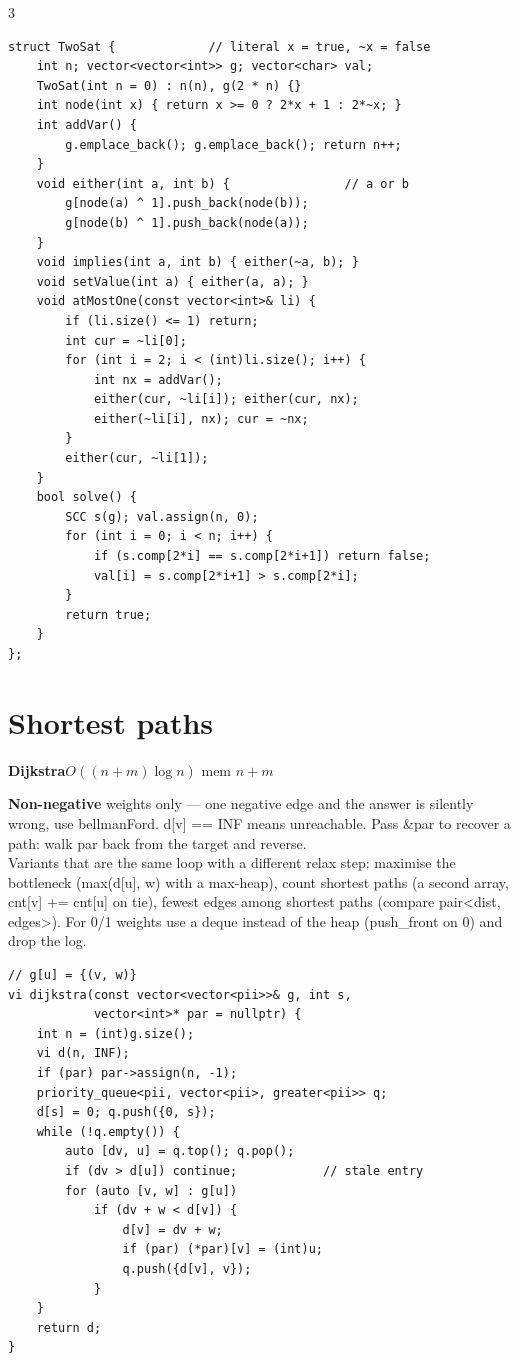 \documentclass[9pt,a4paper]{extarticle}
\newcommand{\entry}[3]{%
  \addcontentsline{toc}{subsection}{#1}%
  \vspace{0.8ex}%
  \noindent\colorbox{hdbg}{\parbox{\dimexpr\columnwidth-2\fboxsep}{%
    \strut\textbf{#1}\hfill{\footnotesize\textsf{#2}}}}\par
  \vspace{0.4ex}%
  {\footnotesize #3\par}%
}
\newcommand{\code}[1]{{\ttfamily\small #1}}
\begin{document}
\begin{multicols*}{3}
\begin{lstlisting}
struct TwoSat {             // literal x = true, ~x = false
    int n; vector<vector<int>> g; vector<char> val;
    TwoSat(int n = 0) : n(n), g(2 * n) {}
    int node(int x) { return x >= 0 ? 2*x + 1 : 2*~x; }
    int addVar() {
        g.emplace_back(); g.emplace_back(); return n++;
    }
    void either(int a, int b) {                // a or b
        g[node(a) ^ 1].push_back(node(b));
        g[node(b) ^ 1].push_back(node(a));
    }
    void implies(int a, int b) { either(~a, b); }
    void setValue(int a) { either(a, a); }
    void atMostOne(const vector<int>& li) {
        if (li.size() <= 1) return;
        int cur = ~li[0];
        for (int i = 2; i < (int)li.size(); i++) {
            int nx = addVar();
            either(cur, ~li[i]); either(cur, nx);
            either(~li[i], nx); cur = ~nx;
        }
        either(cur, ~li[1]);
    }
    bool solve() {
        SCC s(g); val.assign(n, 0);
        for (int i = 0; i < n; i++) {
            if (s.comp[2*i] == s.comp[2*i+1]) return false;
            val[i] = s.comp[2*i+1] > s.comp[2*i];
        }
        return true;
    }
};
\end{lstlisting}

\section{Shortest paths}

\entry{Dijkstra}{$O((n + m) \log n)$ \quad mem $n + m$}{%
\textbf{Non-negative} weights only --- one negative edge and the answer is silently
wrong, use \code{bellmanFord}. \code{d[v] == INF} means unreachable. Pass \code{\&par} to
recover a path: walk \code{par} back from the target and reverse.\\[0.3ex]
Variants that are the same loop with a different relax step: maximise the bottleneck
(\code{max(d[u], w)} with a max-heap), count shortest paths (a second array,
\code{cnt[v] += cnt[u]} on tie), fewest edges among shortest paths (compare
\code{pair<dist, edges>}). For 0/1 weights use a \code{deque} instead of the heap
(push\_front on 0) and drop the log.}

\begin{lstlisting}
// g[u] = {(v, w)}
vi dijkstra(const vector<vector<pii>>& g, int s,
            vector<int>* par = nullptr) {
    int n = (int)g.size();
    vi d(n, INF);
    if (par) par->assign(n, -1);
    priority_queue<pii, vector<pii>, greater<pii>> q;
    d[s] = 0; q.push({0, s});
    while (!q.empty()) {
        auto [dv, u] = q.top(); q.pop();
        if (dv > d[u]) continue;            // stale entry
        for (auto [v, w] : g[u])
            if (dv + w < d[v]) {
                d[v] = dv + w;
                if (par) (*par)[v] = (int)u;
                q.push({d[v], v});
            }
    }
    return d;
}
\end{lstlisting}


\end{multicols*}
\end{document}
